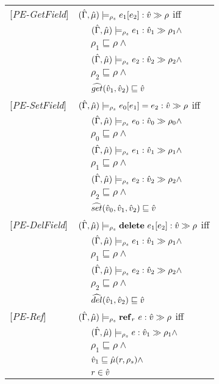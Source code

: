 \begin{tabular} {l l l l}
{[\textit{PE-GetField}]}&\multicolumn{3}{l}{$(\hat{\Gamma},\hat{\mu}) \models_{\rho_s} e_1[e_2] : \hat{v} \gg \rho $ iff}\\
&&\multicolumn{2}{l}{$ (\hat{\Gamma},\hat{\mu}) \models_{\rho_s} e_1 : \hat{v}_{1} \gg \rho_{1} \wedge $}\\
&&\multicolumn{2}{l}{$\rho_1 \sqsubseteq \rho \wedge$} \\
&&\multicolumn{2}{l}{$ (\hat{\Gamma},\hat{\mu}) \models_{\rho_s} e_2 : \hat{v}_{2} \gg \rho_{2} \wedge $} \\
&&\multicolumn{2}{l}{$\rho_2 \sqsubseteq \rho \wedge$} \\
&&\multicolumn{2}{l}{$\widehat{get} (\hat{v}_1, \hat{v}_2) \sqsubseteq \hat{v}$} \\
{[\textit{PE-SetField}]}&\multicolumn{3}{l}{$(\hat{\Gamma},\hat{\mu}) \models_{\rho_s} e_0[e_1] = e_2 : \hat{v} \gg \rho $ iff}\\
&&\multicolumn{2}{l}{$ (\hat{\Gamma},\hat{\mu}) \models_{\rho_s} e_0 : \hat{v}_{0} \gg \rho_{0} \wedge $}\\
&&\multicolumn{2}{l}{$\rho_0 \sqsubseteq \rho \wedge$} \\
&&\multicolumn{2}{l}{$ (\hat{\Gamma},\hat{\mu}) \models_{\rho_s} e_1 : \hat{v}_{1} \gg \rho_{1} \wedge $} \\
&&\multicolumn{2}{l}{$\rho_1 \sqsubseteq \rho \wedge$} \\
&&\multicolumn{2}{l}{$ (\hat{\Gamma},\hat{\mu}) \models_{\rho_s} e_2 : \hat{v}_{2} \gg \rho_{2} \wedge $} \\
&&\multicolumn{2}{l}{$\rho_2 \sqsubseteq \rho \wedge$} \\
&&\multicolumn{2}{l}{$\widehat{set} (\hat{v}_0, \hat{v}_1, \hat{v}_2) \sqsubseteq \hat{v}$} \\
{[\textit{PE-DelField}]}&\multicolumn{3}{l}{$(\hat{\Gamma},\hat{\mu}) \models_{\rho_s} \mathbf{delete}\ e_1[e_2] : \hat{v} \gg \rho $ iff}\\
&&\multicolumn{2}{l}{$ (\hat{\Gamma},\hat{\mu}) \models_{\rho_s} e_1 : \hat{v}_{1} \gg \rho_{1} \wedge$}\\
&&\multicolumn{2}{l}{$\rho_1 \sqsubseteq \rho \wedge$} \\
&&\multicolumn{2}{l}{$ (\hat{\Gamma},\hat{\mu}) \models_{\rho_s} e_2 : \hat{v}_{2} \gg \rho_{2} \wedge $} \\
&&\multicolumn{2}{l}{$\rho_2 \sqsubseteq \rho \wedge$} \\
&&\multicolumn{2}{l}{$\widehat{del} (\hat{v}_1, \hat{v}_2) \sqsubseteq \hat{v}$}\\
{[\textit{PE-Ref}]}&\multicolumn{3}{l}{$ (\hat{\Gamma},\hat{\mu}) \models_{\rho_s} \mathbf{ref}_{r}\ e : \hat{v} \gg \rho$ iff}\\
&&\multicolumn{2}{l}{$ (\hat{\Gamma},\hat{\mu}) \models_{\rho_s} e : \hat{v}_{1} \gg \rho_{1} \wedge $}\\
&&\multicolumn{2}{l}{$\rho_1 \sqsubseteq \rho\wedge$}\\
&&\multicolumn{2}{l}{$\hat{v}_1 \sqsubseteq \hat{\mu}(r, \rho_s) \wedge $} \\
&&\multicolumn{2}{l}{$r \in \hat{v}$} \\

\end{tabular}

